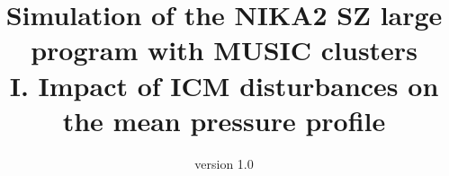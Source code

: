 \documentclass[twocolumn,traditabstract]{aa}
\begin{document}
\def\aj{AJ}%
\def\araa{ARA\&A}%
\def\apj{ApJ}%
\def\apjl{ApJ}%
\def\apjs{ApJS}%
\def\aap{A\&A}%
 \def\aapr{A\&A~Rev.}%
\def\aaps{A\&AS}%
\def\mnras{MNRAS}
\def\ssr{SSRv}
\def\nat{Nature}
\def\jcap{JCAP}

\def\Mgv{M_{\rm g,500}}
\def\Mg{M_{\rm g}}
\def\YX {Y_{\rm X}}
\def\LXv {L_{\rm X,500}}
\def\TX {T_{\rm X}}
\def\fgv {f_{\rm g,500}}
\def\fg  {f_{\rm g}}
\def\kT {{\rm k}T}
\def\ne {n_{\rm e}}
\def\Mv {M_{\rm 500}}
\def \Rv {R_{500}}
\def\keV {\rm keV}
\def\Yv{Y_{500}}


\def\MT {$M$--$T_{\rm X}$}
\def\MYX {$M$--$Y_{\rm X}$}
\def\MMg {$M_{500}$--$M_{\rm g,500}$}
\def\MgT {$M_{\rm g,500}$--$T_{\rm X}$}
\def\MgY {$M_{\rm g,500}$--$Y_{\rm X}$}

\def\msol {{\rm M_{\odot}}}

\def\lesssim{\mathrel{\hbox{\rlap{\hbox{\lower4pt\hbox{$\sim$}}}\hbox{$<$}}}}
\def\gtrsim{\mathrel{\hbox{\rlap{\hbox{\lower4pt\hbox{$\sim$}}}\hbox{$>$}}}}

\def\psz{PSZ2\,G144.83$+$25.11}

\def\xmm{XMM-{\it Newton}}
\def\planck{{\it Planck}} 
\def\chandra{{\it Chandra}}
\def \rosat {\hbox{\it ROSAT}}
\newcommand{\excpres}{{\gwpfont EXCPRES}}
\newcommand{\ma}[1]{\textcolor{red}{{ #1}}}
\title{Simulation of the NIKA2 SZ large program with MUSIC clusters\\ I. Impact of ICM disturbances on the mean pressure profile}

\author{version 1.0}
\end{document}
